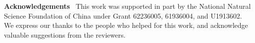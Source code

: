 \documentclass{SCIS2019}
\begin{document}
\hspace*{\fill}

\noindent
\textbf{Acknowledgements} \ This work was supported in part by the National Natural Science Foundation of China under Grant 62236005, 61936004, and U1913602. We express our thanks to the people who helped for this work, and acknowledge valuable suggestions from the reviewers.











\scriptsize
 
\end{document}
